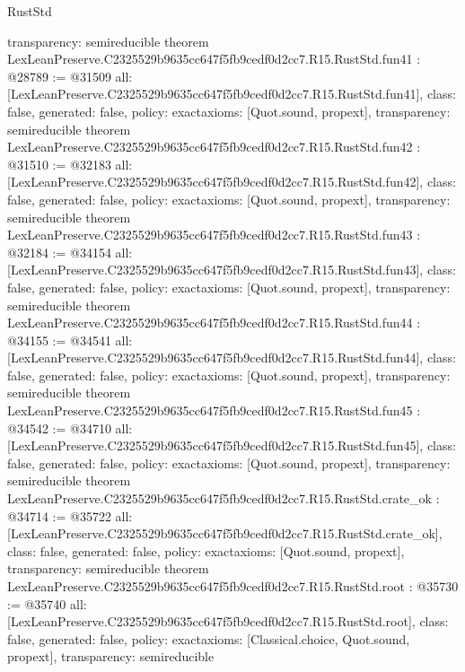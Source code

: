 \begin{lexlean}{RustStd}
\begin{coremodule}
{  transparency: semireducible
}
theorem LexLeanPreserve.C2325529b9635cc647f5fb9cedf0d2cc7.R15.RustStd.fun41 : @28789 := @31509 {
  all: [LexLeanPreserve.C2325529b9635cc647f5fb9cedf0d2cc7.R15.RustStd.fun41],
  class: false,
  generated: false,
  policy: exact{axioms: [Quot.sound, propext]},
  transparency: semireducible
}
theorem LexLeanPreserve.C2325529b9635cc647f5fb9cedf0d2cc7.R15.RustStd.fun42 : @31510 := @32183 {
  all: [LexLeanPreserve.C2325529b9635cc647f5fb9cedf0d2cc7.R15.RustStd.fun42],
  class: false,
  generated: false,
  policy: exact{axioms: [Quot.sound, propext]},
  transparency: semireducible
}
theorem LexLeanPreserve.C2325529b9635cc647f5fb9cedf0d2cc7.R15.RustStd.fun43 : @32184 := @34154 {
  all: [LexLeanPreserve.C2325529b9635cc647f5fb9cedf0d2cc7.R15.RustStd.fun43],
  class: false,
  generated: false,
  policy: exact{axioms: [Quot.sound, propext]},
  transparency: semireducible
}
theorem LexLeanPreserve.C2325529b9635cc647f5fb9cedf0d2cc7.R15.RustStd.fun44 : @34155 := @34541 {
  all: [LexLeanPreserve.C2325529b9635cc647f5fb9cedf0d2cc7.R15.RustStd.fun44],
  class: false,
  generated: false,
  policy: exact{axioms: [Quot.sound, propext]},
  transparency: semireducible
}
theorem LexLeanPreserve.C2325529b9635cc647f5fb9cedf0d2cc7.R15.RustStd.fun45 : @34542 := @34710 {
  all: [LexLeanPreserve.C2325529b9635cc647f5fb9cedf0d2cc7.R15.RustStd.fun45],
  class: false,
  generated: false,
  policy: exact{axioms: [Quot.sound, propext]},
  transparency: semireducible
}
theorem LexLeanPreserve.C2325529b9635cc647f5fb9cedf0d2cc7.R15.RustStd.crate_ok : @34714 := @35722 {
  all: [LexLeanPreserve.C2325529b9635cc647f5fb9cedf0d2cc7.R15.RustStd.crate_ok],
  class: false,
  generated: false,
  policy: exact{axioms: [Quot.sound, propext]},
  transparency: semireducible
}
theorem LexLeanPreserve.C2325529b9635cc647f5fb9cedf0d2cc7.R15.RustStd.root : @35730 := @35740 {
  all: [LexLeanPreserve.C2325529b9635cc647f5fb9cedf0d2cc7.R15.RustStd.root],
  class: false,
  generated: false,
  policy: exact{axioms: [Classical.choice, Quot.sound, propext]},
  transparency: semireducible
}


\end{coremodule}
\end{lexlean}
